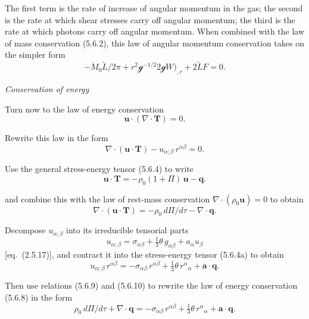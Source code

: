The first term is the rate of increase of angular momentum in the gas; the second
is the rate at which shear stresses carry off angular momentum; the third is the
rate at which photons carry off angular momentum.  When combined with the
law of mass conservation (5.6.2), this law of angular momentum conservation
takes on the simpler form
\begin{equation}
-\dot{M}_0 \tilde{L}/2\pi + r^2 \mathscr{g}^{-1/2} 2\mathscr{g} W)_{,r}
+ 2\tilde{L}F = 0.
\tag{5.6.6}
\end{equation}

\bigskip
\noindent\textit{Conservation of energy}

\medskip
Turn now to the law of energy conservation
\begin{equation}
\mathbf{u} \cdot (\nabla \cdot \mathbf{T}) = 0.
\tag{5.6.7}
\end{equation}

Rewrite this law in the form
\begin{equation}
\nabla \cdot (\mathbf{u} \cdot \mathbf{T}) - u_{\alpha;\beta}\, r^{\alpha\beta} = 0.
\tag{5.6.8}
\end{equation}

Use the general stress-energy tensor (5.6.4) to write
\begin{equation}
\mathbf{u} \cdot \mathbf{T} = -\rho_0(1+\Pi)\,\mathbf{u} - \mathbf{q}.
\tag{5.6.9}
\end{equation}

and combine this with the law of rest-mass conservation $\nabla \cdot (\rho_0 \mathbf{u}) = 0$ to obtain
\begin{equation}
\nabla \cdot (\mathbf{u} \cdot \mathbf{T}) = -\rho_0\, d\Pi/d\tau
- \nabla \cdot \mathbf{q}.
\end{equation}

Decompose $u_{\alpha;\beta}$ into its irreducible tensorial parts
\begin{equation}
u_{\alpha;\beta} = \sigma_{\alpha\beta} + \tfrac{1}{3}\theta\, g_{\alpha\beta} + a_\alpha u_\beta
\end{equation}
[eq.\ (2.5.17)], and contract it into the stress-energy tensor (5.6.4a) to obtain
\begin{equation}
u_{\alpha;\beta}\, r^{\alpha\beta} = -\sigma_{\alpha\beta}\,r^{\alpha\beta}
+ \tfrac{1}{3}\theta\, r^\alpha{}_\alpha + \mathbf{a} \cdot \mathbf{q}.
\tag{5.6.10}
\end{equation}

Then use relations (5.6.9) and (5.6.10) to rewrite the law of energy conservation
(5.6.8) in the form
\begin{equation}
\rho_0\, d\Pi/d\tau + \nabla \cdot \mathbf{q}
= -\sigma_{\alpha\beta}\,r^{\alpha\beta}
+ \tfrac{1}{3}\theta\, r^\alpha{}_\alpha
+ \mathbf{a} \cdot \mathbf{q}.
\tag{5.6.11}
\end{equation}

